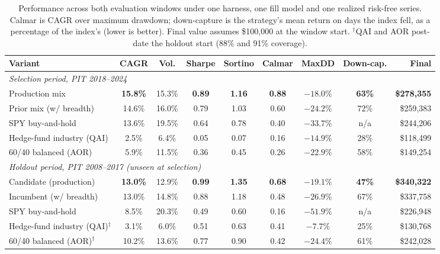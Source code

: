 \documentclass[conference]{IEEEtran}
\begin{document}
\begin{table}[!t]
\caption{Performance across both evaluation windows under one harness, one fill
model and one realized risk-free series. Calmar is CAGR over maximum drawdown;
down-capture is the strategy's mean return on days the index fell, as a
percentage of the index's (lower is better). Final value assumes \$100{,}000 at
the window start. $^\dagger$QAI and AOR post-date the holdout start (88\% and
91\% coverage).}
\label{tab:perf}
\centering
\setlength{\tabcolsep}{4pt}
\footnotesize
\begin{tabular}{lcccccccr}
\toprule
Variant & CAGR & Vol. & Sharpe & Sortino & Calmar & MaxDD & Down-cap. & Final \\
\midrule
\multicolumn{9}{l}{\emph{Selection period, PIT 2018--2024}} \\
Production mix & \textbf{15.8\%} & 15.3\% & \textbf{0.89} & \textbf{1.16} & \textbf{0.88} & $\mathbf{-18.0\%}$ & \textbf{63\%} & \textbf{\$278{,}355} \\
Prior mix (w/ breadth) & 14.6\% & 16.0\% & 0.79 & 1.03 & 0.60 & $-24.2\%$ & 72\% & \$259{,}383 \\
SPY buy-and-hold & 13.6\% & 19.5\% & 0.64 & 0.78 & 0.40 & $-33.7\%$ & n/a & \$244{,}206 \\
Hedge-fund industry (QAI) & 2.5\% & 6.4\% & 0.05 & 0.07 & 0.16 & $-14.9\%$ & 28\% & \$118{,}499 \\
60/40 balanced (AOR) & 5.9\% & 11.5\% & 0.36 & 0.45 & 0.26 & $-22.9\%$ & 58\% & \$149{,}254 \\
\midrule
\multicolumn{9}{l}{\emph{Holdout period, PIT 2008--2017 (unseen at selection)}} \\
Candidate (production) & \textbf{13.0\%} & 12.9\% & \textbf{0.99} & \textbf{1.35} & \textbf{0.68} & $\mathbf{-19.1\%}$ & \textbf{47\%} & \textbf{\$340{,}322} \\
Incumbent (w/ breadth) & 13.0\% & 14.8\% & 0.88 & 1.18 & 0.48 & $-26.9\%$ & 67\% & \$337{,}758 \\
SPY buy-and-hold & 8.5\% & 20.3\% & 0.49 & 0.60 & 0.16 & $-51.9\%$ & n/a & \$226{,}948 \\
Hedge-fund industry (QAI)$^\dagger$ & 3.1\% & 6.0\% & 0.51 & 0.63 & 0.41 & $-7.7\%$ & 25\% & \$130{,}768 \\
60/40 balanced (AOR)$^\dagger$ & 10.2\% & 13.6\% & 0.77 & 0.90 & 0.42 & $-24.4\%$ & 61\% & \$242{,}028 \\
\bottomrule
\end{tabular}
\end{table}
\end{document}
